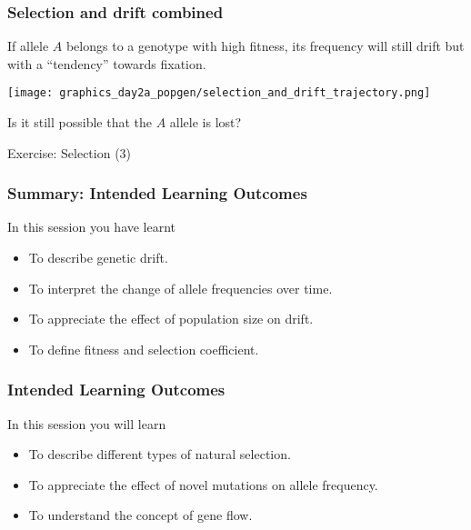 \documentclass{beamer}
\newcommand{\1}{\ensuremath{\mathbf{1}}}
\begin{document}
%
%
%
\begin{frame}\frametitle{Selection and drift combined}
	If allele $A$ belongs to a genotype with high fitness, its frequency will still drift but with a ``tendency'' towards fixation.
	\begin{center}
		\texttt{[image: graphics\_day2a\_popgen/selection\_and\_drift\_trajectory.png]}
	\end{center}
	Is it still possible that the $A$ allele is lost?
\end{frame}
%
%
%
\begin{frame}
	\begin{center}
		Exercise: Selection (3)
	\end{center}
\end{frame}
%
%
%
\begin{frame}\frametitle{Summary: Intended Learning Outcomes}
	In this session you have learnt
	\begin{itemize}
		\item To describe genetic drift.
		\item To interpret the change of allele frequencies over time.
		\item To appreciate the effect of population size on drift.
		\item To define fitness and selection coefficient.
	\end{itemize}
\end{frame}
%
%
%
\begin{frame}\frametitle{Intended Learning Outcomes}
	In this session you will learn
	\begin{itemize}
		\item To describe different types of natural selection.
		\item To appreciate the effect of novel mutations on allele frequency.
		\item To understand the concept of gene flow.
	\end{itemize}
\end{frame}
\end{document}
